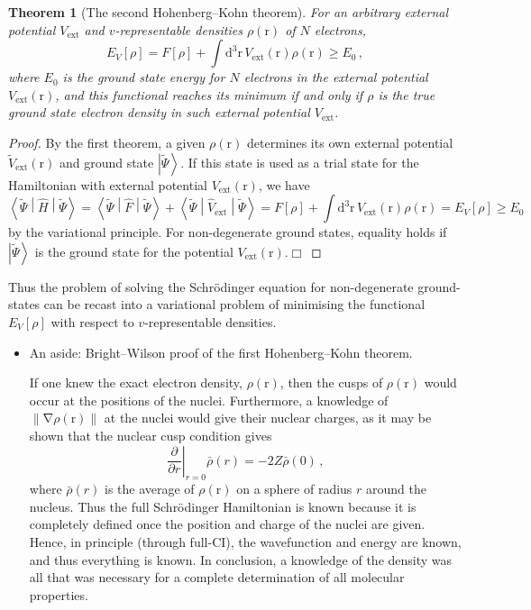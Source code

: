 \documentclass{article}
\theoremstyle{plain}\theoremheaderfont{\normalfont\itshape}\theorembodyfont{\rmfamily}\theoremseparator{.}\newtheorem*{rem}{Remark}\newtheorem*{ex}{Example}\newtheorem*{proof}{Proof}\newtheorem*{altp}{Alternative proof}
\theoremstyle{plain}\theoremheaderfont{\normalfont\bfseries}\theorembodyfont{\rmfamily}\theoremseparator{.}\newtheorem{thm}{Theorem}[section]\newtheorem{lem}[thm]{Lemma}\newtheorem{prop}[thm]{Proposition}\newtheorem*{cor}{Corollary}\newtheorem{defn}[thm]{Definition}\newtheorem{clm}[thm]{Claim}\newtheorem{clminproof}{Claim}
\theoremstyle{break}\theoremheaderfont{\normalfont\itshape}\theorembodyfont{\rmfamily}\theoremseparator{.\medskip}\newtheorem*{proofskip}{Proof}\newtheorem*{exs}{Examples}\newtheorem*{rems}{Remarks}
\theoremstyle{break}\theoremheaderfont{\normalfont\bfseries}\theorembodyfont{\rmfamily}\theoremseparator{.\medskip}\newtheorem{lemskip}[thm]{Lemma}\newtheorem{defnskip}[thm]{Definition}\newtheorem{propskip}[thm]{Proposition}\newtheorem{thmskip}[thm]{Theorem}
\numberwithin{equation}{section}
\newcommand{\qed}{\hfill\ensuremath{\Box}}
\newcommand{\dd}[2][]{\mathrm{d}^{#1} #2\,}
\newcommand{\pdv}[3][]{\frac{\partial^{#1} #2}{{\partial #3}^{#1}}}
\newcommand{\ket}[1]{\left| #1 \right\rangle}
\newcommand{\expval}[2]{\left\langle #2 \middle| #1 \middle| #2 \right\rangle}
\newcommand{\vb}[1]{\bm{\mathrm{#1}}}
\newcommand{\norm}[1]{\left\| #1 \right\|}
\newcommand{\grad}{\vb{\nabla}}
\newcommand{\ext}{_{\text{ext}}}
\begin{document}
    \begin{thm}[The second Hohenberg--Kohn theorem]
        For an arbitrary external potential \(V\ext\) and \(v\)-representable densities \(\rho(\vb{r})\) of \(N\) electrons,
        \begin{equation}\label{DFT_energy}
            E_V[\rho]=F[\rho]+\int\dd[3]{\vb{r}}V\ext(\vb{r})\rho(\vb{r})\ge E_0\,,
        \end{equation}
        where \(E_0\) is the ground state energy for \(N\) electrons in the external potential \(V\ext(\vb{r})\), and this functional reaches its minimum if and only if \(\rho\) is the true ground state electron density in such external potential \(V\ext\).
    \end{thm}
    \begin{proof}
        By the first theorem, a given \(\rho(\vb{r})\) determines its own external potential \(\tilde{V}\ext(\vb{r})\) and ground state \(\ket{\tilde{\Psi}}\). If this state is used as a trial state for the Hamiltonian with external potential \(V\ext(\vb{r})\), we have
        \begin{equation}
            \expval{\hat{H}}{\tilde{\Psi}}=\expval{\hat{F}}{\tilde{\Psi}}+\expval{\hat{V}\ext}{\tilde{\Psi}}=F[\rho]+\int\dd[3]{\vb{r}}V\ext(\vb{r})\rho(\vb{r})=E_V[\rho]\ge E_0
        \end{equation}
        by the variational principle. For non-degenerate ground states, equality holds if \(\ket{\tilde{\Psi}}\) is the ground state for the potential \(V\ext(\vb{r})\).\qed
    \end{proof}

    Thus the problem of solving the Schr\"{o}dinger equation for non-degenerate ground-states can be recast into a variational problem of minimising the functional \(E_V[\rho]\) with respect to \(v\)-representable densities.

    \begin{itemize}[topsep=0pt]
        \item An aside: Bright--Wilson proof of the first Hohenberg--Kohn theorem.
        
        If one knew the exact electron density, \(\rho(\vb{r})\), then the cusps of \(\rho(\vb{r})\) would occur at the positions of the nuclei. Furthermore, a knowledge of \(\norm{\grad\rho(\vb{r})}\) at the nuclei would give their nuclear charges, as it may be shown that the nuclear cusp condition gives
    \begin{equation}
        \left.\pdv{}{r}\right|_{r=0} \bar{\rho}(r)=-2Z\bar{\rho}(0)\,,
    \end{equation}
    where \(\bar{\rho}(r)\) is the average of \(\rho(\vb{r})\) on a sphere of radius \(r\) around the nucleus. Thus the full Schr\"{o}dinger Hamiltonian is known because it is completely defined once the position and charge of the nuclei are given. Hence, in principle (through full-CI), the wavefunction and energy are known, and thus everything is known. In conclusion, a knowledge of the density was all that was necessary for a complete determination of all molecular properties.
    \end{itemize}
\end{document}
